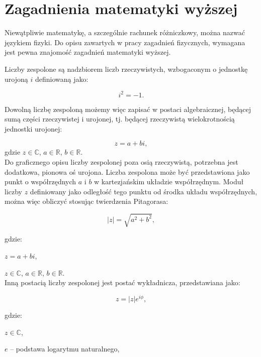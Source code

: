 \documentclass{SGGW-thesis}
\begin{document}
	\section{Zagadnienia matematyki wyższej}
	Niewątpliwie matematykę, a szczególnie rachunek różniczkowy, można nazwać językiem fizyki. Do opisu zawartych w pracy zagadnień fizycznych, wymagana jest pewna znajomość zagadnień matematyki wyższej.

	Liczby zespolone są nadzbiorem liczb rzeczywistych, wzbogaconym o jednostkę urojoną $i$ \cite{liczby zespolone}definiowaną jako: 
	
	\begin{equation}
	i^2=-1.
	\end{equation}
	
	Dowolną liczbę zespoloną możemy więc zapisać w postaci algebraicznej, będącej sumą części rzeczywistej i urojonej, tj. będącej rzeczywistą wielokrotnością jednostki urojonej:
	
	\begin{equation}
	z = a+bi,
	\end{equation}
	gdzie
	$z \in \mathbb{C}$,
	$a \in \mathbb{R}$,
	$b \in \mathbb{R}$.\\
	
	Do graficznego opisu liczby zespolonej poza osią rzeczywistą, potrzebna jest dodatkowa, pionowa oś urojona. Liczba zespolona może być przedstawiona jako punkt o współrzędnych $a$ i $b$ w kartezjańskim układzie współrzędnym. Moduł liczby $z$ definiowany jako odległość tego punktu od środka układu współrzędnych, można więc obliczyć stosując twierdzenia Pitagorasa:
	
	\begin{equation}
	|z| = \sqrt{a^2+b^2},
	\end{equation}
	
	gdzie:
	
	$ z = a + bi$,
	
	$z \in \mathbb{C}$,
	$a \in \mathbb{R}$,
	$b \in \mathbb{R}$.\\
	
	Inną postacią liczby zespolonej jest postać wykładnicza, przedstawiana jako:
	
	\begin{equation}
	z = |z|e^{i\phi},
	\end{equation}
	
	gdzie:
	
	$z \in \mathbb{C}$,
	
	$e$ -- podstawa logarytmu naturalnego,
	
\end{document}
